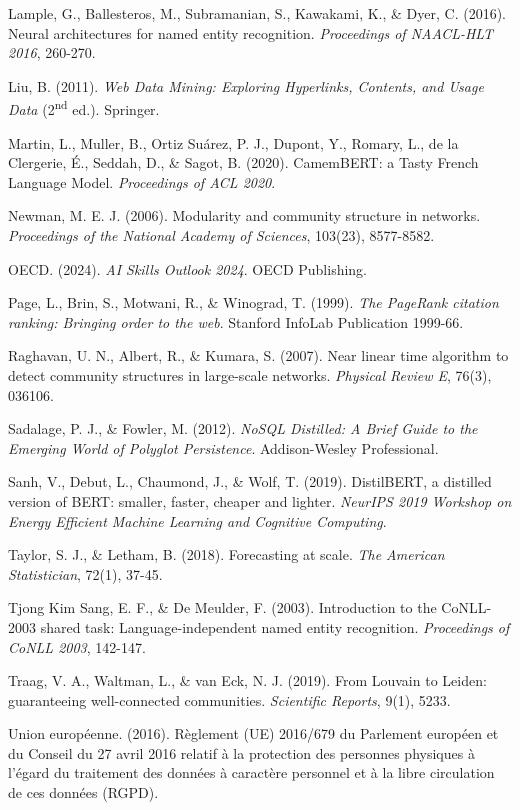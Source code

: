\documentclass[11pt,a4paper,openany]{report}
\begin{document}
Lample, G., Ballesteros, M., Subramanian, S., Kawakami, K., \& Dyer, C. (2016). Neural architectures for named entity recognition. \emph{Proceedings of NAACL-HLT 2016}, 260-270.

Liu, B. (2011). \emph{Web Data Mining: Exploring Hyperlinks, Contents, and Usage Data} (2\textsuperscript{nd} ed.). Springer.

Martin, L., Muller, B., Ortiz Su\'arez, P. J., Dupont, Y., Romary, L., de la Clergerie, \'E., Seddah, D., \& Sagot, B. (2020). CamemBERT: a Tasty French Language Model. \emph{Proceedings of ACL 2020}.

Newman, M. E. J. (2006). Modularity and community structure in networks. \emph{Proceedings of the National Academy of Sciences}, 103(23), 8577-8582.

OECD. (2024). \emph{AI Skills Outlook 2024}. OECD Publishing.

Page, L., Brin, S., Motwani, R., \& Winograd, T. (1999). \emph{The PageRank citation ranking: Bringing order to the web}. Stanford InfoLab Publication 1999-66.

Raghavan, U. N., Albert, R., \& Kumara, S. (2007). Near linear time algorithm to detect community structures in large-scale networks. \emph{Physical Review E}, 76(3), 036106.

Sadalage, P. J., \& Fowler, M. (2012). \emph{NoSQL Distilled: A Brief Guide to the Emerging World of Polyglot Persistence}. Addison-Wesley Professional.

Sanh, V., Debut, L., Chaumond, J., \& Wolf, T. (2019). DistilBERT, a distilled version of BERT: smaller, faster, cheaper and lighter. \emph{NeurIPS 2019 Workshop on Energy Efficient Machine Learning and Cognitive Computing}.

Taylor, S. J., \& Letham, B. (2018). Forecasting at scale. \emph{The American Statistician}, 72(1), 37-45.

Tjong Kim Sang, E. F., \& De Meulder, F. (2003). Introduction to the CoNLL-2003 shared task: Language-independent named entity recognition. \emph{Proceedings of CoNLL 2003}, 142-147.

Traag, V. A., Waltman, L., \& van Eck, N. J. (2019). From Louvain to Leiden: guaranteeing well-connected communities. \emph{Scientific Reports}, 9(1), 5233.

Union europ\'eenne. (2016). R\`eglement (UE) 2016/679 du Parlement europ\'een et du Conseil du 27 avril 2016 relatif \`a la protection des personnes physiques \`a l'\'egard du traitement des donn\'ees \`a caract\`ere personnel et \`a la libre circulation de ces donn\'ees (RGPD).
\end{document}
